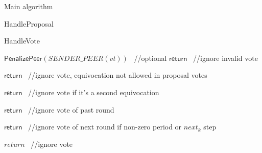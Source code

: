 \documentclass[10pt,a4paper]{article}
\begin{document}
\begin{section}{Main algorithm}
\begin{subsection}{HandleProposal}
\end{subsection}


\begin{subsection}{HandleVote}\label{ssect:HandleVote}

    \begin{algorithm}[H]
        \begin{algorithmic}[1]

            
            
            


                \State $\mathsf{PenalizePeer}(SENDER\_PEER(vt))$ \ //optional
                \State $\mathsf{return}$ \ //ignore invalid vote
            \EndIf

                \State $\mathsf{return}$ \ //ignore vote, equivocation not allowed in proposal votes
            \EndIf

                \State $\mathsf{return}$ \ //ignore vote if it's a second equivocation
            \EndIf

                \State $\mathsf{return}$ \ //ignore vote of past round
            \EndIf

                \State $\mathsf{return}$ \ //ignore vote of next round if non-zero period or $next_k$ step
            \EndIf

                \State $return$ \ //ignore vote
            \EndIf


\end{algorithmic}
\end{algorithm}
\end{subsection}
\end{section}
\end{document}
